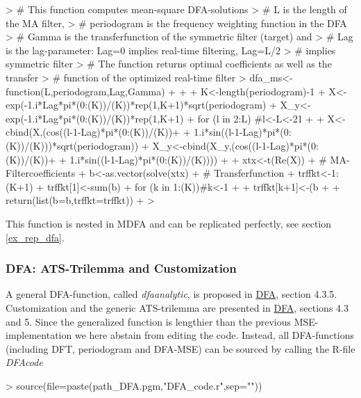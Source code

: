 \documentclass[a4paper]{book}
\begin{document}
\begin{Schunk}
\begin{Sinput}
> # This function computes mean-square DFA-solutions
> # L is the length of the MA filter,
> # periodogram is the frequency weighting function in the DFA
> # Gamma is the transferfunction of the symmetric filter (target) and
> # Lag is the lag-parameter: Lag=0 implies real-time filtering, Lag=L/2
> #     implies symmetric filter
> # The function returns optimal coefficients as well as the transfer 
> #     function of the optimized real-time filter
> dfa_ms<-function(L,periodogram,Lag,Gamma)
+ {
+ 
+   K<-length(periodogram)-1
+   X<-exp(-1.i*Lag*pi*(0:(K))/(K))*rep(1,K+1)*sqrt(periodogram)
+   X_y<-exp(-1.i*Lag*pi*(0:(K))/(K))*rep(1,K+1)
+   for (l in 2:L)          #l<-L<-21
+   {
+     X<-cbind(X,(cos((l-1-Lag)*pi*(0:(K))/(K))+
+     1.i*sin((l-1-Lag)*pi*(0:(K))/(K)))*sqrt(periodogram))
+     X_y<-cbind(X_y,(cos((l-1-Lag)*pi*(0:(K))/(K))+
+     1.i*sin((l-1-Lag)*pi*(0:(K))/(K))))
+   }
+   xtx<-t(Re(X))%
+ # MA-Filtercoefficients
+   b<-as.vector(solve(xtx)%
+ # Transferfunction
+   trffkt<-1:(K+1)
+   trffkt[1]<-sum(b)
+   for (k in 1:(K))#k<-1
+   {
+     trffkt[k+1]<-(b%
+   }
+   return(list(b=b,trffkt=trffkt))
+ }
> 
\end{Sinput}
\end{Schunk}
This function is nested in MDFA and can be replicated perfectly, see section \ref{ex_rep_dfa}. 

\subsubsection{DFA: ATS-Trilemma and Customization}

A general DFA-function, called \emph{dfa\textunderscore analytic}, is proposed in \href{http://blog.zhaw.ch/sef/files/2014/10/DFA.pdf}{DFA}, section 4.3.5. Customization and the generic ATS-trilemma are presented in \href{http://blog.zhaw.ch/sef/files/2014/10/DFA.pdf}{DFA}, sections 4.3 and 5.  Since the generalized function is lengthier than the previous MSE-implementation we here abstain from editing the code. Instead, all DFA-functions (including DFT, periodogram and DFA-MSE) can be sourced by calling the R-file \emph{DFA\textunderscore code}
\begin{Schunk}
\begin{Sinput}
> source(file=paste(path_DFA.pgm,"DFA_code.r",sep=""))
\end{Sinput}
\end{Schunk}
\end{document}
